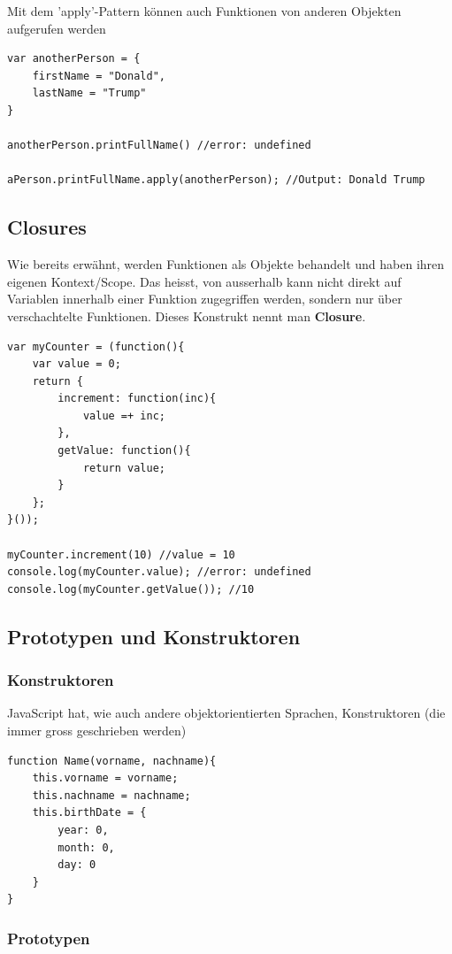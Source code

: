 \documentclass[a4paper, 11pt]{article}
\begin{document}
Mit dem 'apply'-Pattern können auch Funktionen von anderen Objekten aufgerufen werden

\begin{lstlisting}
var anotherPerson = {
	firstName = "Donald",
	lastName = "Trump"
}

anotherPerson.printFullName() //error: undefined

aPerson.printFullName.apply(anotherPerson); //Output: Donald Trump
\end{lstlisting}

\subsection{Closures}
Wie bereits erwähnt, werden Funktionen als Objekte behandelt und haben ihren eigenen Kontext/Scope. Das heisst, von ausserhalb kann nicht direkt auf Variablen innerhalb einer Funktion zugegriffen werden, sondern nur über verschachtelte Funktionen. Dieses Konstrukt nennt man \textbf{Closure}.

\begin{lstlisting}
var myCounter = (function(){
	var value = 0;
	return {
		increment: function(inc){
			value =+ inc;
		},
		getValue: function(){
			return value;
		}
	};
}());

myCounter.increment(10) //value = 10
console.log(myCounter.value); //error: undefined
console.log(myCounter.getValue()); //10
\end{lstlisting}

\subsection{Prototypen und Konstruktoren}
\subsubsection{Konstruktoren}
JavaScript hat, wie auch andere objektorientierten Sprachen, Konstruktoren (die immer gross geschrieben werden)

\begin{lstlisting}
function Name(vorname, nachname){
	this.vorname = vorname;
	this.nachname = nachname;
	this.birthDate = {
		year: 0,
		month: 0,
		day: 0
	}
}
\end{lstlisting}

\subsubsection{Prototypen}
\end{document}
